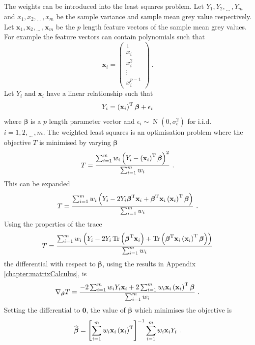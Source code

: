\documentclass[12pt]{report}
\DeclareMathOperator{\trace}{Tr}
\DeclareMathOperator{\normal}{N}
\newcommand{\T}{^\textup{T}}
\newcommand{\dotdotdot}{_{\phantom{.}\cdots}}
\newcommand{\vect}[1]{\mathbf{#1}}
\newcommand{\vectGreek}[1]{\boldsymbol{#1}}
\begin{document}
The weights can be introduced into the least squares problem. Let $Y_1,Y_2,\dotdotdot,Y_m$ and $x_1,x_2,\dotdotdot,x_m$ be the sample variance and sample mean grey value respectively. Let $\vect{x}_1,\vect{x}_2,\dotdotdot,\vect{x}_m$ be the $p$ length feature vectors of the sample mean grey values. For example the feature vectors can contain polynomials such that
\begin{equation}
\vect{x}_i=
\begin{pmatrix}
	1\\x_i\\x_i^2\\\vdots\\x_i^{p-1}
\end{pmatrix} \ .
\end{equation}
Let $Y_i$ and $\vect{x}_i$ have a linear relationship such that
\begin{equation}
Y_i = \left(\vect{x}_i\right)\T\vectGreek{\beta} + \epsilon_i
\end{equation}
where $\vectGreek{\beta}$ is a $p$ length parameter vector and $\epsilon_i\sim\normal(0,\sigma_{\epsilon}^2)$ for i.i.d.~$i=1,2,\dotdotdot,m$. The weighted least squares is an optimisation problem where the objective $T$ is minimised by varying $\vectGreek{\beta}$
\begin{equation}
T =
\frac{\sum_{i=1}^mw_i\left(Y_i-\left(\vect{x}_i\right)\T\vectGreek{\beta}\right)^2}
{\sum_{i=1}^mw_i} \ .
\end{equation}
This can be expanded
\begin{equation*}
T =
\frac{\sum_{i=1}^mw_i\left(Y_i-2Y_i\vectGreek{\beta}\T\vect{x}_i+\vectGreek{\beta}\T\vect{x}_i\left(\vect{x}_i\right)\T\vectGreek{\beta}\right)}
{\sum_{i=1}^mw_i} \ .
\end{equation*}
Using the properties of the trace
\begin{equation*}
T =
\frac{\sum_{i=1}^mw_i\left(Y_i-2Y_i\trace\left(\vectGreek{\beta}\T\vect{x}_i\right)+\trace\left(\vectGreek{\beta}\T\vect{x}_i\left(\vect{x}_i\right)\T\vectGreek{\beta}\right)\right)}
{\sum_{i=1}^mw_i}
\end{equation*}
the differential with respect to $\vectGreek{\beta}$, using the results in Appendix \ref{chapter:matrixCalculus}, is
\begin{equation}
\nabla_{\vectGreek{\beta}}T = \frac{-2\sum_{i=1}^mw_iY_i\vect{x}_i+2\sum_{i=1}^mw_i\vect{x}_i\left(\vect{x}_i\right)\T\vectGreek{\beta}}{\sum_{i=1}^mw_i} \ .
\end{equation}
Setting the differential to $\vect{0}$, the value of $\vectGreek{\beta}$ which minimises the objective is 
\begin{equation}
\widehat{\vectGreek{\beta}}=\left[\sum_{i=1}^mw_i\vect{x}_i\left(\vect{x}_i\right)\T\right]^{-1}\sum_{i=1}^mw_i\vect{x}_iY_i \ .
\end{equation}
\end{document}
